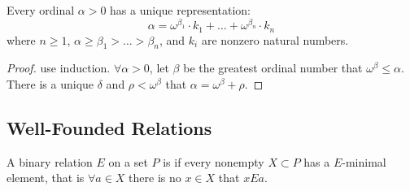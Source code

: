 \begin{theorem}
    Every ordinal $\alpha > 0$ has a unique representation:
    \begin{equation}
        \alpha = \omega^{\beta_1} \cdot k_1 + \dots + \omega^{\beta_n} \cdot k_n
    \end{equation}
    where $n \geq 1$, $\alpha \geq \beta_1 > \dots > \beta_n$, and $k_i$ are nonzero natural numbers.
\end{theorem}
\begin{proof}
    use induction. $\forall \alpha > 0$, let $\beta$ be the greatest ordinal number that $\omega^\beta \leq \alpha$. There is a unique $\delta$ and $\rho < \omega^\beta$ that $\alpha = \omega^\beta + \rho$. 
\end{proof}




\subsection{Well-Founded Relations}

\begin{definition}
    A binary relation $E$ on a set $P$ is  if every nonempty $X \subset P$ has a $E$-minimal element, that is $\forall a \in X$ there is no $x \in X$ that $x E a$.
\end{definition}

